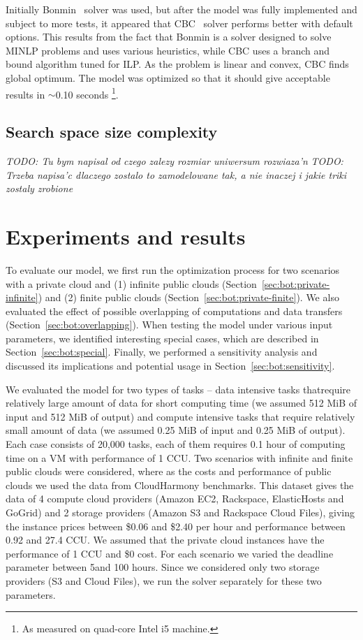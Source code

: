 {  Initially {Bonmin}~\cite{Bonami2008} solver was used, but after the model was fully implemented and subject to more tests, it appeared that CBC~\cite{cbc-solver} solver performs better with default options. This results from the fact that {Bonmin} is a solver designed to solve MINLP problems and uses various heuristics, while CBC uses a branch and bound algorithm tuned for ILP. As the problem is linear and convex, CBC finds global optimum. The model was optimized so that it should give acceptable results in $\sim$0.10 seconds \footnote{As measured on quad-core Intel i5 machine.}.

\subsection{Search space size complexity}

  \emph{TODO: Tu bym napisal od czego zalezy rozmiar uniwersum rozwiaza'n}
  \emph{TODO: Trzeba napisa'c dlaczego zostalo to zamodelowane tak, a nie inaczej i jakie triki zostaly zrobione}

\section{Experiments and results}
\label{sec:bot:results}
    
  To evaluate our model, we first run the optimization process for two scenarios with a private cloud and (1) infinite public clouds (Section~\ref{sec:bot:private-infinite}) and (2) finite public clouds (Section~\ref{sec:bot:private-finite}). We also evaluated the effect of possible overlapping of computations and data transfers (Section~\ref{sec:bot:overlapping}). When testing the model under various input parameters, we identified interesting special cases, which are described in Section~\ref{sec:bot:special}. Finally, we performed a sensitivity analysis and discussed its implications and potential usage in Section~\ref{sec:bot:sensitivity}.
    
  We evaluated the model for two types of tasks -- data intensive tasks thatrequire relatively large amount of data for short computing time (we assumed 512 MiB of input and 512 MiB of output) and compute intensive tasks that require relatively small amount of data (we assumed 0.25 MiB of input and 0.25 MiB of output). Each case consists of 20,000 tasks, each of them requires 0.1 hour of computing time on a VM with performance of 1 CCU. Two scenarios with infinite and finite public clouds were considered, where as the costs and performance of public clouds we used the data from CloudHarmony benchmarks. This dataset gives the data of 4 compute cloud providers (Amazon EC2, Rackspace, ElasticHosts and GoGrid) and 2 storage providers (Amazon S3 and Rackspace Cloud Files), giving the instance prices between \$0.06 and \$2.40 per hour and performance between 0.92 and 27.4 CCU. We assumed that the private cloud instances have the performance of 1 CCU and \$0 cost.  For each scenario we varied the deadline parameter between 5and 100 hours.  Since we considered only two storage providers (S3 and Cloud Files), we run the solver separately for these two parameters.
    
}

